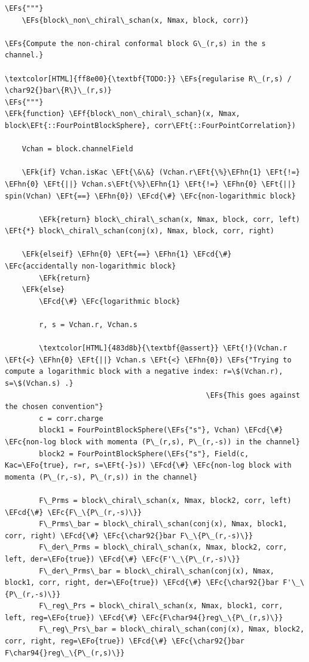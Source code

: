 \documentclass[a4paper]{article}
\numberwithin{equation}{section}
\newcommand{\EFc}[1]{\textcolor{EFc}{#1}} %
\newcommand{\EFcd}[1]{\textcolor{EFcd}{#1}} %
\newcommand{\EFs}[1]{\textcolor{EFs}{#1}} %
\newcommand{\EFk}[1]{\textcolor{EFk}{#1}} %
\newcommand{\EFf}[1]{\textcolor{EFf}{#1}} %
\newcommand{\EFt}[1]{\textcolor{EFt}{#1}} %
\newcommand{\EFo}[1]{\textcolor{EFo}{#1}} %
\newcommand{\EFhn}[1]{\textcolor{EFhn}{#1}} %
\begin{document}
\begin{Code}
\begin{Verbatim}
\EFs{"""}
    \EFs{block\_non\_chiral\_schan(x, Nmax, block, corr)}

\EFs{Compute the non-chiral conformal block G\_(r,s) in the s channel.}

\textcolor[HTML]{ff8e00}{\textbf{TODO:}} \EFs{regularise R\_(r,s) / \char92{}bar\{R\}\_(r,s)}
\EFs{"""}
\EFk{function} \EFf{block\_non\_chiral\_schan}(x, Nmax, block\EFt{::FourPointBlockSphere}, corr\EFt{::FourPointCorrelation})

    Vchan = block.channelField

    \EFk{if} Vchan.isKac \EFt{\&\&} (Vchan.r\EFt{\%}\EFhn{1} \EFt{!=} \EFhn{0} \EFt{||} Vchan.s\EFt{\%}\EFhn{1} \EFt{!=} \EFhn{0} \EFt{||} spin(Vchan) \EFt{==} \EFhn{0}) \EFcd{\#} \EFc{non-logarithmic block}

        \EFk{return} block\_chiral\_schan(x, Nmax, block, corr, left) \EFt{*} block\_chiral\_schan(conj(x), Nmax, block, corr, right)

    \EFk{elseif} \EFhn{0} \EFt{==} \EFhn{1} \EFcd{\#} \EFc{accidentally non-logarithmic block}
        \EFk{return}
    \EFk{else}
        \EFcd{\#} \EFc{logarithmic block}

        r, s = Vchan.r, Vchan.s

        \textcolor[HTML]{483d8b}{\textbf{@assert}} \EFt{!}(Vchan.r \EFt{<} \EFhn{0} \EFt{||} Vchan.s \EFt{<} \EFhn{0}) \EFs{"Trying to compute a logarithmic block with a negative index: r=\$(Vchan.r), s=\$(Vchan.s) .}
                                               \EFs{This goes against the chosen convention"}
        c = corr.charge
        block1 = FourPointBlockSphere(\EFs{"s"}, Vchan) \EFcd{\#} \EFc{non-log block with momenta (P\_(r,s), P\_(r,-s)) in the channel}
        block2 = FourPointBlockSphere(\EFs{"s"}, Field(c, Kac=\EFo{true}, r=r, s=\EFt{-}s)) \EFcd{\#} \EFc{non-log block with momenta (P\_(r,-s), P\_(r,s)) in the channel}

        F\_Prms = block\_chiral\_schan(x, Nmax, block2, corr, left) \EFcd{\#} \EFc{F\_\{P\_(r,-s)\}}
        F\_Prms\_bar = block\_chiral\_schan(conj(x), Nmax, block1, corr, right) \EFcd{\#} \EFc{\char92{}bar F\_\{P\_(r,-s)\}}
        F\_der\_Prms = block\_chiral\_schan(x, Nmax, block2, corr, left, der=\EFo{true}) \EFcd{\#} \EFc{F'\_\{P\_(r,-s)\}}
        F\_der\_Prms\_bar = block\_chiral\_schan(conj(x), Nmax, block1, corr, right, der=\EFo{true}) \EFcd{\#} \EFc{\char92{}bar F'\_\{P\_(r,-s)\}}
        F\_reg\_Prs = block\_chiral\_schan(x, Nmax, block1, corr, left, reg=\EFo{true}) \EFcd{\#} \EFc{F\char94{}reg\_\{P\_(r,s)\}}
        F\_reg\_Prs\_bar = block\_chiral\_schan(conj(x), Nmax, block2, corr, right, reg=\EFo{true}) \EFcd{\#} \EFc{\char92{}bar F\char94{}reg\_\{P\_(r,s)\}}


\end{Verbatim}
\end{Code}
\end{document}
